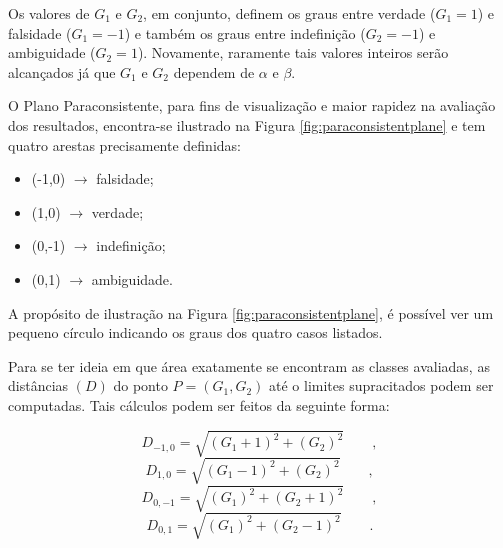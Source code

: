 \documentclass[a4paper,12pt,openright,oneside]{book}
\newenvironment{myenv}[1]
  {\begin{spacing}{#1}}
  {\end{spacing}}
\begin{document}
\begin{myenv}{1.5}
					\par Os valores de $G_1$ e $G_2$, em conjunto, definem os graus entre verdade ($G_1=1$) e falsidade ($G_1=-1$) e também os graus entre indefinição ($G_2=-1$) e ambiguidade ($G_2=1$). Novamente, raramente tais valores inteiros serão alcançados já que $G_1$ e $G_2$ dependem de $\alpha$ e $\beta$.
					
					\par O Plano Paraconsistente, para fins de visualização e maior rapidez na avaliação dos resultados, encontra-se ilustrado na Figura \ref{fig:paraconsistentplane} e tem quatro arestas precisamente definidas:
					\begin{itemize}
						\item (-1,0) $\rightarrow$ falsidade;
						\item (1,0) $\rightarrow$ verdade;
						\item (0,-1) $\rightarrow$ indefinição;
						\item (0,1) $\rightarrow$ ambiguidade.
					\end{itemize}
					\par A propósito de ilustração na Figura \ref{fig:paraconsistentplane}, é possível ver um pequeno círculo indicando os graus dos quatro casos listados.
					
					\par Para se ter ideia em que área exatamente se encontram as classes avaliadas, as distâncias $(D)$ do ponto $P=(G_1,G_2)$ até o limites supracitados podem ser computadas. Tais cálculos podem ser feitos da seguinte forma:
					
					\begin{equation}
						D_{-1,0}=\sqrt{(G_1+1)^2+(G_2)^2}\qquad,
					\end{equation}
					\begin{equation}
						D_{1,0}=\sqrt{(G_1-1)^2+(G_2)^2}\qquad,
					\end{equation}
					\begin{equation}
						D_{0,-1}=\sqrt{(G_1)^2+(G_2+1)^2}\qquad,		
					\end{equation}
					\begin{equation}
						D_{0,1}=\sqrt{(G_1)^2+(G_2-1)^2}\qquad.
					\end{equation}		
					

\end{myenv}
\end{document}
